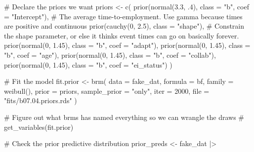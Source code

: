 \documentclass[
  letterpaper,
  DIV=11,
  numbers=noendperiod]{scrreprt}
\newenvironment{Shaded}{\begin{snugshade}}{\end{snugshade}}
\newcommand{\AttributeTok}[1]{\textcolor[rgb]{0.40,0.45,0.13}{#1}}
\newcommand{\CommentTok}[1]{\textcolor[rgb]{0.37,0.37,0.37}{#1}}
\newcommand{\DecValTok}[1]{\textcolor[rgb]{0.68,0.00,0.00}{#1}}
\newcommand{\FloatTok}[1]{\textcolor[rgb]{0.68,0.00,0.00}{#1}}
\newcommand{\FunctionTok}[1]{\textcolor[rgb]{0.28,0.35,0.67}{#1}}
\newcommand{\NormalTok}[1]{\textcolor[rgb]{0.00,0.23,0.31}{#1}}
\newcommand{\OtherTok}[1]{\textcolor[rgb]{0.00,0.23,0.31}{#1}}
\newcommand{\SpecialCharTok}[1]{\textcolor[rgb]{0.37,0.37,0.37}{#1}}
\newcommand{\StringTok}[1]{\textcolor[rgb]{0.13,0.47,0.30}{#1}}
\begin{document}
\begin{Shaded}
\begin{Highlighting}[]
\CommentTok{\# Declare the priors we want}
\NormalTok{priors }\OtherTok{\textless{}{-}} \FunctionTok{c}\NormalTok{(}
    \FunctionTok{prior}\NormalTok{(}\FunctionTok{normal}\NormalTok{(}\FloatTok{3.3}\NormalTok{, .}\DecValTok{4}\NormalTok{), }\AttributeTok{class =} \StringTok{"b"}\NormalTok{, }\AttributeTok{coef =} \StringTok{"Intercept"}\NormalTok{), }\CommentTok{\# The average time{-}to{-}employment. Use gamma because times are positive and continuous}
    \FunctionTok{prior}\NormalTok{(}\FunctionTok{cauchy}\NormalTok{(}\DecValTok{0}\NormalTok{, }\FloatTok{2.5}\NormalTok{), }\AttributeTok{class =} \StringTok{"shape"}\NormalTok{), }\CommentTok{\# Constrain the shape parameter, or else it thinks event times can go on basically forever.}
    \FunctionTok{prior}\NormalTok{(}\FunctionTok{normal}\NormalTok{(}\DecValTok{0}\NormalTok{, }\FloatTok{1.45}\NormalTok{), }\AttributeTok{class =} \StringTok{"b"}\NormalTok{, }\AttributeTok{coef =} \StringTok{"adapt"}\NormalTok{),}
    \FunctionTok{prior}\NormalTok{(}\FunctionTok{normal}\NormalTok{(}\DecValTok{0}\NormalTok{, }\FloatTok{1.45}\NormalTok{), }\AttributeTok{class =} \StringTok{"b"}\NormalTok{, }\AttributeTok{coef =} \StringTok{"age"}\NormalTok{),}
    \FunctionTok{prior}\NormalTok{(}\FunctionTok{normal}\NormalTok{(}\DecValTok{0}\NormalTok{, }\FloatTok{1.45}\NormalTok{), }\AttributeTok{class =} \StringTok{"b"}\NormalTok{, }\AttributeTok{coef =} \StringTok{"collab"}\NormalTok{),}
    \FunctionTok{prior}\NormalTok{(}\FunctionTok{normal}\NormalTok{(}\DecValTok{0}\NormalTok{, }\FloatTok{1.45}\NormalTok{), }\AttributeTok{class =} \StringTok{"b"}\NormalTok{, }\AttributeTok{coef =} \StringTok{"ei\_status"}\NormalTok{)}
\NormalTok{  )}

\CommentTok{\# Fit the model}
\NormalTok{fit.prior }\OtherTok{\textless{}{-}} \FunctionTok{brm}\NormalTok{(}
  \AttributeTok{data =}\NormalTok{ fake\_dat,}
  \AttributeTok{formula =}\NormalTok{ bf,}
  \AttributeTok{family =} \FunctionTok{weibull}\NormalTok{(),}
  \AttributeTok{prior =}\NormalTok{ priors,}
  \AttributeTok{sample\_prior =} \StringTok{"only"}\NormalTok{,}
  \AttributeTok{iter =} \DecValTok{2000}\NormalTok{,}
  \AttributeTok{file =} \StringTok{"fits/b07.04.priors.rds"}
\NormalTok{)}

\CommentTok{\# Figure out what brms has named everything so we can wrangle the draws}
\CommentTok{\# get\_variables(fit.prior)}
    
\CommentTok{\# Check the prior predictive distribution}
\NormalTok{prior\_preds }\OtherTok{\textless{}{-}}\NormalTok{ fake\_dat }\SpecialCharTok{|\textgreater{}}


\end{Highlighting}
\end{Shaded}
\end{document}
